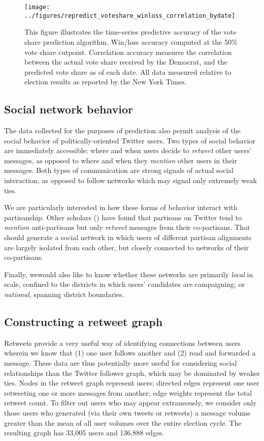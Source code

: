 \documentclass[11pt]{article}
\begin{document}
\begin{figure}[ht]
  \centering
  \texttt{[image: ../figures/repredict\_voteshare\_winloss\_correlation\_bydate]}
  \caption{This figure illustrates the time-series predictive accuracy of the vote share prediction algorithm. Win/loss accuracy computed at the 50\% vote share cutpoint. Correlation accuracy measures the correlation between the actual vote share received by the Democrat, and the predicted vote share as of each date. All data measured relative to election results as reported by the New York Times.}
  \label{fig:pred-acc-corr-timeseries}
\end{figure}


\subsection{Social network behavior}
\label{sec:soci-netw-behav}

The data collected for the purposes of prediction also permit analysis
of the social behavior of politically-oriented Twitter users. Two
types of social behavior are immediately accessible: where and when
users decide to \textit{retweet} other users' messages, as opposed to
where and when they \textit{mention} other users in their
messages. Both types of communication are strong signals of actual
social interaction, as opposed to follow networks which may signal
only extremely weak ties.

We are particularly interested in how these forms of behavior interact
with partisanship. Other scholars () have found that partisans on
Twitter tend to \textit{mention} anti-partisans but only
\textit{retweet} messages from their co-partisans. That should
generate a social network in which users of different partisan
alignments are largely isolated from each other, but closely connected
to networks of their co-partisans. 

Finally, wewould also like to know whether these networks are
primarily \textit{local} in scale, confined to the districts in which
users' candidates are campaigning; or \textit{national}, spanning
district boundaries. 

\subsection{Constructing a retweet graph}
\label{sec:constr-retw-graph}

Retweets provide a very useful way of identifying connections between
users wherein we know that (1) one user follows another and (2) read
and forwarded a message. These data are thus potentially more useful
for considering social relationships than the Twitter follower graph,
which may be dominated by weaker ties. Nodes in the retweet graph
represent users; directed edges represent one user retweeting one or
more messages from another; edge weights represent the total retweet
count. To filter out users who may appear extraneously, we consider
only those users who generated (via their own tweets or retweets) a
message volume greater than the mean of all user volumes over the
entire election cycle. The resulting graph has 33,005 users and
136,888 edges. 
\end{document}
